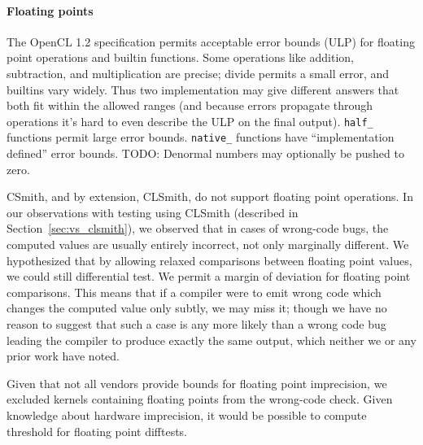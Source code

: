
\paragraph{Floating points} The OpenCL 1.2 specification permits acceptable error bounds (ULP) for floating point operations and builtin functions. Some operations like addition, subtraction, and multiplication are precise; divide permits a small error, and builtins vary widely. Thus two implementation may give different answers that both fit within the allowed ranges (and because errors propagate through operations it's hard to even describe the ULP on the final output). \texttt{half\_} functions permit large error bounds. \texttt{native\_} functions have ``implementation defined'' error bounds. TODO: Denormal numbers may optionally be pushed to zero.

CSmith, and by extension, CLSmith, do not support floating point operations. In our observations with testing using CLSmith (described in Section~\ref{sec:vs_clsmith}), we observed that in cases of wrong-code bugs, the computed values are usually entirely incorrect, not only marginally different. We hypothesized that by allowing relaxed comparisons between floating point values, we could still differential test. We permit a margin of deviation for floating point comparisons. This means that if a compiler were to emit wrong code which changes the computed value only subtly, we may miss it; though we have no reason to suggest that such a case is any more likely than a wrong code bug leading the compiler to produce exactly the same output, which neither we or any prior work have noted.

Given that not all vendors provide bounds for floating point imprecision, we excluded kernels containing floating points from the wrong-code check. Given knowledge about hardware imprecision, it would be possible to compute threshold for floating point difftests.
